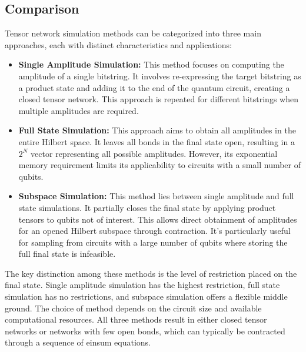 \documentclass[12pt,oneside,a4paper]{article}
\begin{document}

\subsection{Comparison}
Tensor network simulation methods can be categorized into three main approaches, each with distinct characteristics and applications:

\begin{itemize}
	\item \textbf{Single Amplitude Simulation:} This method focuses on computing the amplitude of a single bitstring. It involves re-expressing the target bitstring as a product state and adding it to the end of the quantum circuit, creating a closed tensor network. This approach is repeated for different bitstrings when multiple amplitudes are required.
	\item \textbf{Full State Simulation:} This approach aims to obtain all amplitudes in the entire Hilbert space. It leaves all bonds in the final state open, resulting in a $2^N$ vector representing all possible amplitudes. However, its exponential memory requirement limits its applicability to circuits with a small number of qubits.
	\item \textbf{Subspace Simulation:} This method lies between single amplitude and full state simulations. It partially closes the final state by applying product tensors to qubits not of interest. This allows direct obtainment of amplitudes for an opened Hilbert subspace through contraction. It's particularly useful for sampling from circuits with a large number of qubits where storing the full final state is infeasible.
\end{itemize}
The key distinction among these methods is the level of restriction placed on the final state. Single amplitude simulation has the highest restriction, full state simulation has no restrictions, and subspace simulation offers a flexible middle ground. The choice of method depends on the circuit size and available computational resources.
All three methods result in either closed tensor networks or networks with few open bonds, which can typically be contracted through a sequence of einsum equations.

\end{document}
